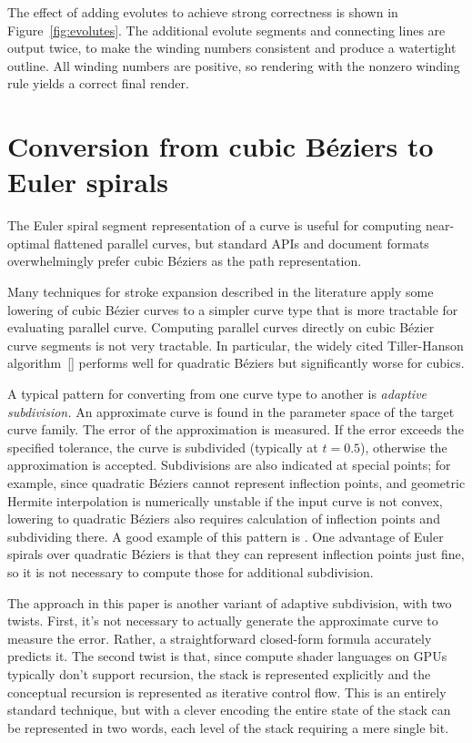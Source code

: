 \documentclass[sigconf, nonacm]{acmart}
\begin{document}
The effect of adding evolutes to achieve strong correctness is shown in Figure~\ref{fig:evolutes}. The additional evolute segments and connecting lines are output twice, to make the winding numbers consistent and produce a watertight outline. All winding numbers are positive, so rendering with the nonzero winding rule yields a correct final render.

\section{Conversion from cubic Béziers to Euler spirals}

The Euler spiral segment representation of a curve is useful for computing near-optimal flattened parallel curves, but standard APIs and document formats overwhelmingly prefer cubic Béziers as the path representation.

Many techniques for stroke expansion described in the literature apply some lowering of cubic Bézier curves to a simpler curve type that is more tractable for evaluating parallel curve. Computing parallel curves directly on cubic Bézier curve segments is not very tractable. In particular, the widely cited Tiller-Hanson algorithm~[] performs well for quadratic Béziers but significantly worse for cubics.


A typical pattern for converting from one curve type to another is \emph{adaptive subdivision.} An approximate curve is found in the parameter space of the target curve family. The error of the approximation is measured. If the error exceeds the specified tolerance, the curve is subdivided (typically at $t = 0.5$), otherwise the approximation is accepted. Subdivisions are also indicated at special points; for example, since quadratic Béziers cannot represent inflection points, and geometric Hermite interpolation is numerically unstable if the input curve is not convex, lowering to quadratic Béziers also requires calculation of inflection points and subdividing there. A good example of this pattern is \citet{Nehab2020}. One advantage of Euler spirals over quadratic Béziers is that they can represent inflection points just fine, so it is not necessary to compute those for additional subdivision.

The approach in this paper is another variant of adaptive subdivision, with two twists. First, it's not necessary to actually generate the approximate curve to measure the error. Rather, a straightforward closed-form formula accurately predicts it. The second twist is that, since compute shader languages on GPUs typically don't support recursion, the stack is represented explicitly and the conceptual recursion is represented as iterative control flow. This is an entirely standard technique, but with a clever encoding the entire state of the stack can be represented in two words, each level of the stack requiring a mere single bit.
\end{document}
